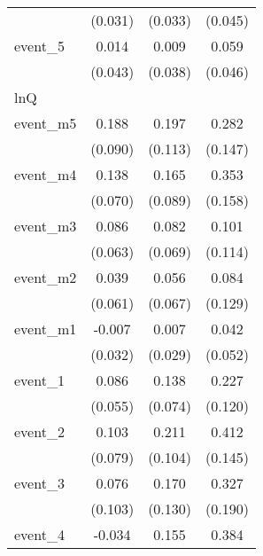 {\begin{tabular}{l*{3}{c}}
            &     (0.031)         &     (0.033)         &     (0.045)         \\
[1em]
event\_5     &       0.014         &       0.009         &       0.059         \\
            &     (0.043)         &     (0.038)         &     (0.046)         \\
\hline
lnQ         &                     &                     &                     \\
event\_m5    &       0.188\sym{*}  &       0.197         &       0.282         \\
            &     (0.090)         &     (0.113)         &     (0.147)         \\
[1em]
event\_m4    &       0.138\sym{*}  &       0.165         &       0.353\sym{*}  \\
            &     (0.070)         &     (0.089)         &     (0.158)         \\
[1em]
event\_m3    &       0.086         &       0.082         &       0.101         \\
            &     (0.063)         &     (0.069)         &     (0.114)         \\
[1em]
event\_m2    &       0.039         &       0.056         &       0.084         \\
            &     (0.061)         &     (0.067)         &     (0.129)         \\
[1em]
event\_m1    &      -0.007         &       0.007         &       0.042         \\
            &     (0.032)         &     (0.029)         &     (0.052)         \\
[1em]
event\_1     &       0.086         &       0.138         &       0.227         \\
            &     (0.055)         &     (0.074)         &     (0.120)         \\
[1em]
event\_2     &       0.103         &       0.211\sym{*}  &       0.412\sym{**} \\
            &     (0.079)         &     (0.104)         &     (0.145)         \\
[1em]
event\_3     &       0.076         &       0.170         &       0.327         \\
            &     (0.103)         &     (0.130)         &     (0.190)         \\
[1em]
event\_4     &      -0.034         &       0.155         &       0.384         \\

\end{tabular}}
